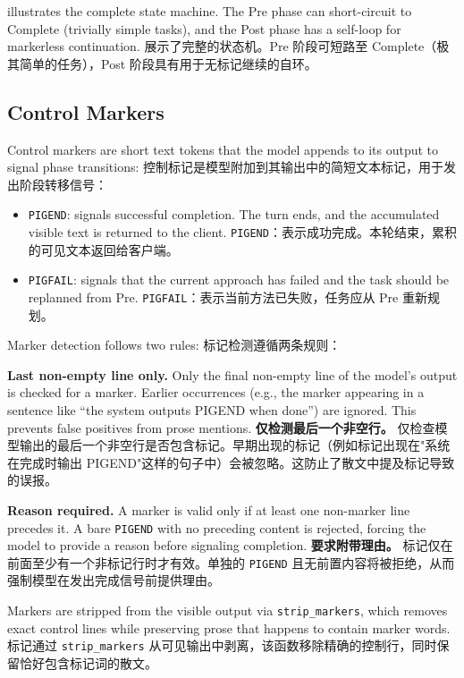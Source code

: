  illustrates the complete state machine. The Pre phase can short-circuit to Complete (trivially simple tasks), and the Post phase has a self-loop for markerless continuation.
 展示了完整的状态机。Pre 阶段可短路至 Complete（极其简单的任务），Post 阶段具有用于无标记继续的自环。

\subsection{Control Markers}
\label{sec:markers}

Control markers are short text tokens that the model appends to its output to signal phase transitions:
控制标记是模型附加到其输出中的简短文本标记，用于发出阶段转移信号：

\begin{itemize}[nosep]
    \item \texttt{PIGEND}: signals successful completion. The turn ends, and the accumulated visible text is returned to the client.
    \texttt{PIGEND}：表示成功完成。本轮结束，累积的可见文本返回给客户端。
    \item \texttt{PIGFAIL}: signals that the current approach has failed and the task should be replanned from Pre.
    \texttt{PIGFAIL}：表示当前方法已失败，任务应从 Pre 重新规划。
\end{itemize}

Marker detection follows two rules:
标记检测遵循两条规则：

\textbf{Last non-empty line only.} Only the final non-empty line of the model's output is checked for a marker. Earlier occurrences (e.g., the marker appearing in a sentence like ``the system outputs PIGEND when done'') are ignored. This prevents false positives from prose mentions.
\textbf{仅检测最后一个非空行。} 仅检查模型输出的最后一个非空行是否包含标记。早期出现的标记（例如标记出现在"系统在完成时输出 PIGEND"这样的句子中）会被忽略。这防止了散文中提及标记导致的误报。

\textbf{Reason required.} A marker is valid only if at least one non-marker line precedes it. A bare \texttt{PIGEND} with no preceding content is rejected, forcing the model to provide a reason before signaling completion.
\textbf{要求附带理由。} 标记仅在前面至少有一个非标记行时才有效。单独的 \texttt{PIGEND} 且无前置内容将被拒绝，从而强制模型在发出完成信号前提供理由。

Markers are stripped from the visible output via \texttt{strip\_markers}, which removes exact control lines while preserving prose that happens to contain marker words.
标记通过 \texttt{strip\_markers} 从可见输出中剥离，该函数移除精确的控制行，同时保留恰好包含标记词的散文。

